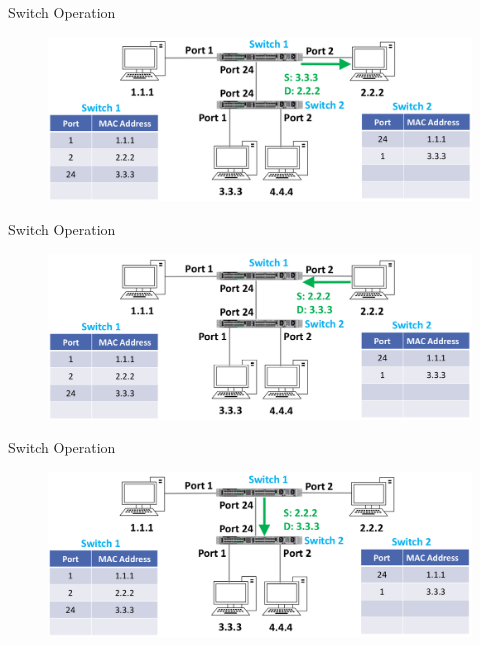 \documentclass[pdflatex,compress,mathserif]{beamer}
\begin{document}
\begin{frame}{Switch Operation}
	\begin{figure}
		\centering
		\includegraphics[width=\linewidth]{img/img24}
	\end{figure}
\end{frame}

\begin{frame}{Switch Operation}
	\begin{figure}
		\centering
		\includegraphics[width=\linewidth]{img/img25}
	\end{figure}
\end{frame}

\begin{frame}{Switch Operation}
	\begin{figure}
		\centering
		\includegraphics[width=\linewidth]{img/img26}
	\end{figure}
\end{frame}
\end{document}
